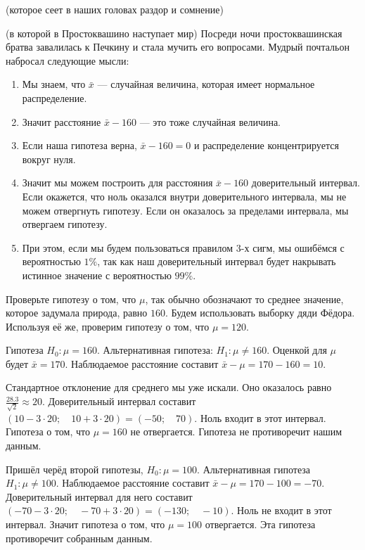 \documentclass[12pt, a4paper, oneside]{article}
\theoremstyle{plain} %
\theoremstyle{definition}
\begin{document}
\begin{problem}{(которое сеет в наших головах раздор и сомнение)}
\begin{problem}{(в которой в Простоквашино наступает мир)}
Посреди ночи простоквашинская братва завалилась к Печкину и стала мучить его вопросами. Мудрый почтальон набросал следующие мысли: 

\begin{enumerate} 
	\item  Мы знаем, что $\bar x $ --- случайная величина, которая имеет нормальное распределение.
	
	\item Значит расстояние  $\bar x - 160$ --- это тоже случайная величина.
	
	\item Если наша гипотеза верна, $\bar x - 160 = 0$  и распределение концентрируется вокруг нуля. 
	
	\item Значит мы можем построить для расстояния $\bar x - 160$ доверительный интервал. Если окажется,  что ноль оказался внутри доверительного интервала, мы не можем отвергнуть гипотезу. Если он оказалось за пределами интервала, мы отвергаем гипотезу. 
	
	\item При этом, если мы будем пользоваться правилом $3$-х сигм, мы ошибёмся с вероятностью $1\%$, так как наш доверительный интервал будет накрывать истинное значение с вероятностью $99\%$. 
\end{enumerate}

Проверьте гипотезу о том, что $\mu$, так обычно обозначают то среднее значение, которое задумала природа, равно $160$. Будем использовать выборку дяди Фёдора. Используя её же, проверим гипотезу о том, что  $\mu = 120$.
\end{problem}

\begin{solution}
Гипотеза $H_0:  \mu = 160.$  Альтернативная гипотеза: $H_1: \mu \ne 160$. Оценкой для $\mu$ будет $\bar x = 170$.  Наблюдаемое расстояние составит $\bar x - \mu = 170 - 160 = 10$. 

Стандартное отклонение для среднего мы уже искали. Оно оказалось равно $\frac{28.3}{\sqrt{2}} \approx 20$. Доверительный интервал составит $(10 - 3 \cdot 20; \quad  10 + 3 \cdot 20) = (-50; \quad  70)$.  Ноль входит в этот интервал. Гипотеза о том, что $\mu = 160$ не отвергается. Гипотеза не противоречит нашим данным.

Пришёл черёд второй гипотезы, $H_0: \mu = 100.$ Альтернативная гипотеза $H_1: \mu \ne 100$. Наблюдаемое расстояние составит $\bar x - \mu = 170 - 100 = -70$.  Доверительный интервал для него составит $(-70 - 3 \cdot 20; \quad -70 + 3 \cdot 20) = (-130; \quad -10)$. Ноль не входит в этот интервал. Значит гипотеза о том, что $\mu = 100$ отвергается. Эта гипотеза противоречит собранным данным.


\end{solution}
\end{problem}
\end{document}
